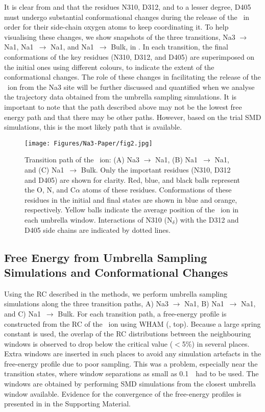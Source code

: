 It is clear from  and  that the residues N310, D312, 
and to a lesser degree, D405 must undergo substantial conformational changes during the 
release of the \Na\ in order for their side-chain oxygen atoms to keep coordinating it. 
To help visualising these changes, we show snapshots of the three transitions, 
Na3 $\rightarrow$ Na1\prim, Na1\prim\ $\rightarrow$ Na1\dprim, and Na1\dprim\ $\rightarrow$ 
Bulk, in . In each transition, the final conformations of the key residues 
(N310, D312, and D405) are superimposed on the initial ones using different colours, to 
indicate the extent of the conformational changes. The role of these changes in facilitating 
the release of the \Na\ ion from the Na3 site will be further discussed and quantified when 
we analyse the trajectory data obtained from the umbrella sampling simulations. It is 
important to note that the path described above may not be the lowest free energy path 
and that there may be other paths. However, based on the trial SMD simulations, this is 
the most likely path that is available.

\begin{figure}[b!]
 \centering
  \texttt{[image: Figures/Na3-Paper/fig2.jpg]}
 \caption{Transition path of the \Na\ ion: (A) Na3 $\rightarrow$ Na1\prim, (B) 
Na1\prim\ $\rightarrow$ Na1\dprim, and (C) Na1\dprim\ $\rightarrow$ Bulk. Only 
the important residues (N310, D312 and D405) are shown for clarity. Red, blue, 
and black balls represent the O, N, and C$\alpha$ atoms of these 
residues. Conformations of these residues in the initial and final states are 
shown in blue and orange, respectively. Yellow balls indicate the average 
position of the \Na\ ion in each umbrella window. Interactions of N310 (N$_{\delta}$) 
with the D312 and D405 side chains are indicated by dotted lines.}
 \label{na3:fig2}
\end{figure}

\subsection{Free Energy from Umbrella Sampling Simulations and Conformational Changes}
Using the RC described in the methods, we perform umbrella sampling simulations along the 
three transition paths, A) Na3 $\rightarrow$ Na1\prim, B) Na1\prim\ $\rightarrow$ Na1\dprim, 
and C) Na1\dprim\ $\rightarrow$ Bulk. For each transition path, a free-energy profile is 
constructed from the RC of the \Na\ ion using WHAM (, top). Because a large 
spring constant is used, the overlap of the RC distributions between the neighbouring windows 
is observed to drop below the critical value ($<$5\%) in several places. Extra windows are 
inserted in such places to avoid any simulation artefacts in the free-energy profile due to poor 
sampling. This was a problem, especially near the transition states, where window separations as 
small as 0.1~\angs\ had to be used. The windows are obtained by performing SMD simulations from 
the closest umbrella window available. Evidence for the convergence of the free-energy profiles 
is presented in  in the Supporting Material. 

